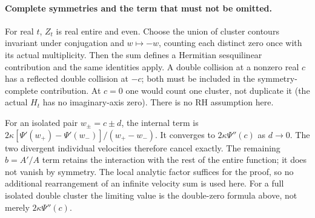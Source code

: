 \paragraph{Complete symmetries and the term that must not be omitted.}
For real $t$, $Z_t$ is real entire and even. Choose the union of
cluster contours invariant under conjugation and $w\mapsto-w$,
counting each distinct zero once with its actual multiplicity.
Then the sum defines a Hermitian sesquilinear contribution and the
same identities apply. A double collision at a nonzero real $c$
has a reflected double collision at $-c$; both must be included
in the symmetry-complete contribution. At $c=0$ one would count
one cluster, not duplicate it (the actual $H_t$ has no imaginary-axis
zero). There is no RH assumption here.

For an isolated pair $w_\pm=c\pm d$, the internal term is
$2\kappa[\Psi'(w_+)-\Psi'(w_-)]/(w_+-w_-)$.
It converges to $2\kappa\Psi''(c)$ as $d\to0$.
The two divergent individual velocities therefore cancel exactly.
The remaining $b=A'/A$ term retains the interaction with the rest
of the entire function; it does not vanish by symmetry. The local
analytic factor suffices for the proof, so no additional rearrangement
of an infinite velocity sum is used here. For a full isolated double
cluster the limiting value is the double-zero formula above, not
merely $2\kappa\Psi''(c)$.

